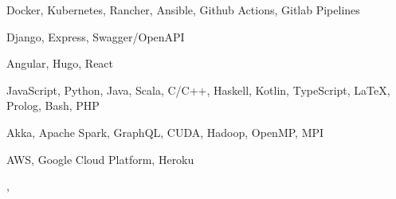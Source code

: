 

\begin{cvskills}

    {Docker, Kubernetes, Rancher, Ansible, Github Actions, Gitlab Pipelines} %

    {Django, Express, Swagger/OpenAPI} %

    {Angular, Hugo, React} %

    {JavaScript, Python, Java, Scala, C/C++, Haskell, Kotlin, TypeScript, LaTeX, Prolog, Bash, PHP} %

    {Akka, Apache Spark, GraphQL, CUDA, Hadoop, OpenMP, MPI}

    {AWS, Google Cloud Platform, Heroku}

    {,
    } %

\end{cvskills}
